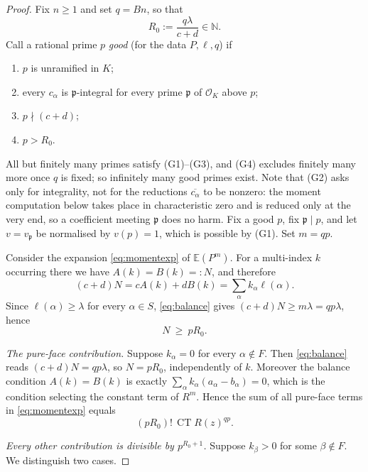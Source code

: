 \documentclass[11pt]{amsart}
\theoremstyle{plain}
\theoremstyle{remark}
\numberwithin{equation}{section}
\DeclareMathOperator{\CT}{CT}
\newcommand{\N}{\mathbb{N}}
\newcommand{\E}{\mathbb{E}}
\begin{document}
\begin{proof}
Fix $n\ge1$ and set $q=Bn$, so that
\[
  R_0:=\frac{q\lambda}{c+d}\in\N .
\]
Call a rational prime $p$ \emph{good} (for the data $P,\ell,q$) if
\begin{enumerate}
\item[(G1)] $p$ is unramified in $K$;
\item[(G2)] every $c_\alpha$ is $\mathfrak p$-integral for every prime
$\mathfrak p$ of $\mathcal O_K$ above $p$;
\item[(G3)] $p\nmid(c+d)$;
\item[(G4)] $p>R_0$.
\end{enumerate}
All but finitely many primes satisfy (G1)--(G3), and (G4) excludes finitely many
more once $q$ is fixed; so infinitely many good primes exist. Note that (G2) asks
only for integrality, not for the reductions $\overline{c_\alpha}$ to be
nonzero: the moment computation below takes place in characteristic zero and is
reduced only at the very end, so a coefficient meeting $\mathfrak p$ does no
harm. Fix a good $p$, fix $\mathfrak p\mid p$, and let $v=v_{\mathfrak p}$ be
normalised by $v(p)=1$, which is possible by (G1). Set $m=qp$.

Consider the expansion \eqref{eq:momentexp} of $\E(P^m)$. For a multi-index $k$
occurring there we have $A(k)=B(k)=:N$, and therefore
\begin{equation}\label{eq:balance}
  (c+d)N=cA(k)+dB(k)=\sum_{\alpha}k_\alpha\ell(\alpha).
\end{equation}
Since $\ell(\alpha)\ge\lambda$ for every $\alpha\in S$, \eqref{eq:balance} gives
$(c+d)N\ge m\lambda=qp\lambda$, hence
\begin{equation}\label{eq:Nlower}
  N\ \ge\ pR_0 .
\end{equation}

\smallskip
\noindent\emph{The pure-face contribution.} Suppose $k_\alpha=0$ for every
$\alpha\notin F$. Then \eqref{eq:balance} reads $(c+d)N=qp\lambda$, so
$N=pR_0$, independently of $k$. Moreover the balance condition $A(k)=B(k)$ is
exactly $\sum_\alpha k_\alpha(a_\alpha-b_\alpha)=0$, which is the condition
selecting the constant term of $R^{m}$. Hence the sum of all pure-face terms in
\eqref{eq:momentexp} equals
\begin{equation}\label{eq:pureface}
  (pR_0)!\,\CT R(z)^{qp}.
\end{equation}

\smallskip
\noindent\emph{Every other contribution is divisible by $p^{R_0+1}$.} Suppose
$k_\beta>0$ for some $\beta\notin F$. We distinguish two cases.


\end{proof}
\end{document}
